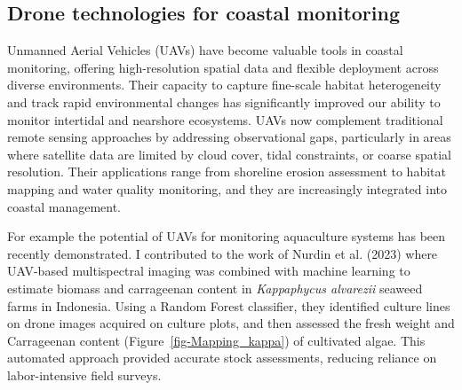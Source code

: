 \documentclass[
  letterpaper,
  11pt,
  english,
  singlespacing,
  headsepline]{MastersDoctoralThesis}
\begin{document}
\begin{spacing}{1.5}
\section{Drone technologies for coastal
monitoring}\label{drone-technologies-for-coastal-monitoring}

Unmanned Aerial Vehicles (UAVs) have become valuable tools in coastal
monitoring, offering high-resolution spatial data and flexible
deployment across diverse environments. Their capacity to capture
fine-scale habitat heterogeneity and track rapid environmental changes
has significantly improved our ability to monitor intertidal and
nearshore ecosystems. UAVs now complement traditional remote sensing
approaches by addressing observational gaps, particularly in areas where
satellite data are limited by cloud cover, tidal constraints, or coarse
spatial resolution. Their applications range from shoreline erosion
assessment to habitat mapping and water quality monitoring, and they are
increasingly integrated into coastal management.

For example the potential of UAVs for monitoring aquaculture systems has
been recently demonstrated. I contributed to the work of Nurdin et al.
(2023) where UAV-based multispectral imaging was combined with machine
learning to estimate biomass and carrageenan content in
\emph{Kappaphycus alvarezii} seaweed farms in Indonesia. Using a Random
Forest classifier, they identified culture lines on drone images
acquired on culture plots, and then assessed the fresh weight and
Carrageenan content (Figure~\ref{fig-Mapping_kappa}) of cultivated
algae. This automated approach provided accurate stock assessments,
reducing reliance on labor-intensive field surveys.

\begin{figure}

\end{figure}
\end{spacing}
\end{document}
